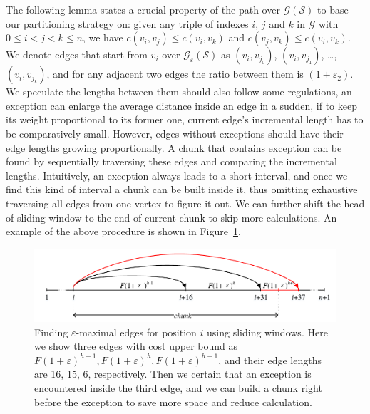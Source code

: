 \documentclass[runningheads]{comsis2}
\begin{document}
The following lemma states a crucial property of the path over $\mathcal{G}\left(\mathcal{S}\right)$ to base our partitioning strategy on:	given any triple of indexes $i$, $j$ and $k$ in $\mathcal{G}$ with $0\leqslant i<j<k\leqslant n$, we have $c(v_{i}, v_{j})\leqslant c(v_{i}, v_{k})$ and $c(v_{j}, v_{k})\leqslant c(v_{i}, v_{k})$.
We denote edges that start from $v_{i}$ over $\mathcal{G}_{\varepsilon}\left(\mathcal{S}\right)$ as $(v_{i}, v_{j_{0}})$, $(v_{i}, v_{j_{1}})$, \ldots, $(v_{i}, v_{j_{k}})$, and for any adjacent two edges the ratio between them is $(1+\varepsilon_{2})$.
We speculate the lengths between them should also follow some regulations, an exception can enlarge the average distance inside an edge in a sudden, if to keep its weight proportional to its former one, current edge's incremental length has to be comparatively small.
However, edges without exceptions should have their edge lengths growing proportionally.
A chunk that contains exception can be found by sequentially traversing these edges and comparing the incremental lengths.
Intuitively, an exception always leads to a short interval, and once we find this kind of interval a chunk can be built inside it, thus omitting exhaustive traversing all edges from one vertex to figure it out.
We can further shift the head of sliding window to the end of current chunk to skip more calculations.
An example of the above procedure is shown in Figure~\ref{fig:exceptions}.

\begin{figure}
	\centering
	\includegraphics[width=0.9\linewidth]{exception}
	\caption{Finding $\varepsilon$-maximal edges for position $ i $ using sliding windows. Here we show three edges with cost upper bound as $ F(1+\varepsilon)^{h-1}, F(1+\varepsilon)^{h}, F(1+\varepsilon)^{h+1} $, and their edge lengths are 16, 15, 6, respectively. Then we certain that an exception is encountered inside the third edge, and we can build a chunk right before the exception to save more space and reduce calculation.}
	\label{fig:exceptions}
\end{figure}
\end{document}
